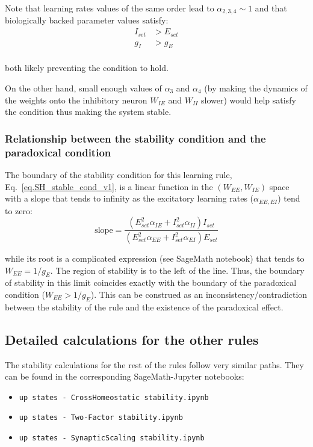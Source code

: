 \documentclass[twocolumn]{article}
\newcommand{\EE}{\mathit{EE}}
\newcommand{\EI}{\mathit{EI}}
\newcommand{\IE}{\mathit{IE}}
\newcommand{\II}{\mathit{II}}
\newcommand{\set}{\mathit{set}}
\begin{document}
Note that learning rates values of the same order lead to $\alpha_{2,3,4} \sim 1$ and that biologically backed parameter values satisfy: 
\begin{displaymath}
\begin{aligned}
I_{\set} & > E_{\set} \\
g_I & > g_E \\
\end{aligned}
\end{displaymath}

\noindent both likely preventing the condition to hold.

On the other hand, small enough values of $\alpha_3$ and $\alpha_4$ (by making the dynamics of the weights onto the inhibitory neuron $W_{\IE}$ and $W_{\II}$ slower) would help satisfy the condition thus making the system stable.




\subsubsection{Relationship between the stability condition and the paradoxical condition}

The boundary of the stability condition for this learning rule, Eq.\ \ref{eq.SH_stable_cond_v1}, is a linear function in the $(W_{\EE},W_{\IE})$ space with a slope that tends to infinity as the excitatory learning rates ($\alpha_{\EE,\EI}$) tend to zero:
\begin{displaymath}
\mbox{slope} = \frac{(E_{\set}^2 \alpha_{\IE} + I_{\set}^2\alpha_{\II})I_{\set}}{(E_{\set}^2\alpha_{\EE} + I_{\set}^2\alpha_{\EI})E_{\set}}
\end{displaymath}

\noindent while its root is a complicated expression (see SageMath notebook) that tends to $W_{\EE} = 1/g_E$. The region of stability is to the left of the line. Thus, the boundary of stability in this limit coincides exactly with the boundary of the paradoxical condition ($W_{\EE}>1/g_E$). This can be construed as an inconsistency/contradiction between the stability of the rule and the existence of the paradoxical effect.




\subsection{Detailed calculations for the other rules}
\label{sec.otherRules_details}

The stability calculations for the rest of the rules follow very similar paths. They can be found in the corresponding SageMath-Jupyter notebooks:
\begin{itemize}
\item[] {\tt up states - CrossHomeostatic stability.ipynb}
\item[] {\tt up states - Two-Factor stability.ipynb}
\item[] {\tt up states - SynapticScaling stability.ipynb}
\end{itemize}
\end{document}
